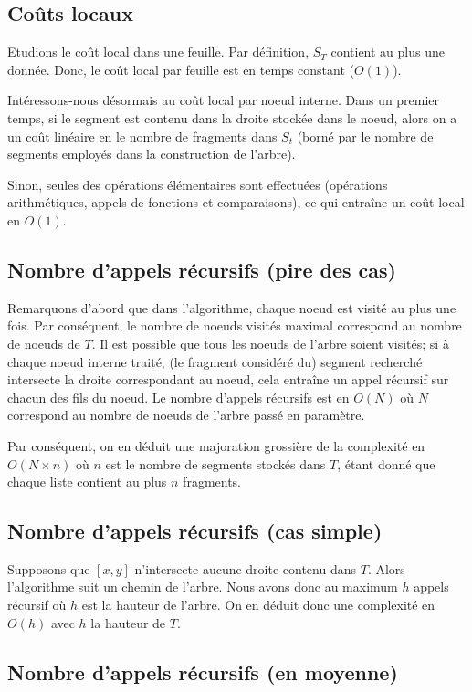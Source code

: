 \subsection{Coûts locaux}
Etudions le coût local dans une feuille.
Par définition, $S_T$ contient au plus une donnée.
Donc, le coût local par feuille est en temps constant ($O(1)$).

Intéressons-nous désormais au coût local par noeud interne.
Dans un premier temps, si le segment est contenu dans
la droite stockée dans le noeud, alors on a un coût linéaire
en le nombre de fragments dans $S_t$ (borné par le nombre de
segments employés dans la construction de l'arbre).

Sinon, seules des opérations élémentaires sont
effectuées (opérations arithmétiques, appels de fonctions
et comparaisons), ce qui entraîne un coût local en $O(1)$.

\subsection{Nombre d'appels récursifs (pire des cas)}
Remarquons d'abord que dans l'algorithme, chaque noeud est
visité au plus une fois.
Par conséquent, le nombre de noeuds visités maximal correspond
au nombre de noeuds de $T$.
Il est possible que tous les noeuds de l'arbre soient visités;
si à chaque noeud interne traité, (le fragment considéré du)
segment recherché intersecte la droite correspondant au noeud,
cela entraîne un appel récursif sur chacun des fils du noeud.
Le nombre d'appels récursifs est en $O(N)$ où $N$ correspond
au nombre de noeuds de l'arbre passé en paramètre.

Par conséquent, on en déduit une majoration grossière de
la complexité en $O(N \times n)$ où $n$ est le nombre de
segments stockés dans $T$, étant donné que chaque liste contient
au plus $n$ fragments.

\subsection{Nombre d'appels récursifs (cas simple)}
Supposons que $[x,y]$ n'intersecte aucune droite contenu dans $T$.
Alors l'algorithme suit un chemin de l'arbre. Nous avons donc
au maximum $h$ appels récursif où $h$ est la hauteur de l'arbre.
On en déduit donc une complexité en $O(h)$ avec $h$ la hauteur de
$T$.

\subsection{Nombre d'appels récursifs (en moyenne)}

